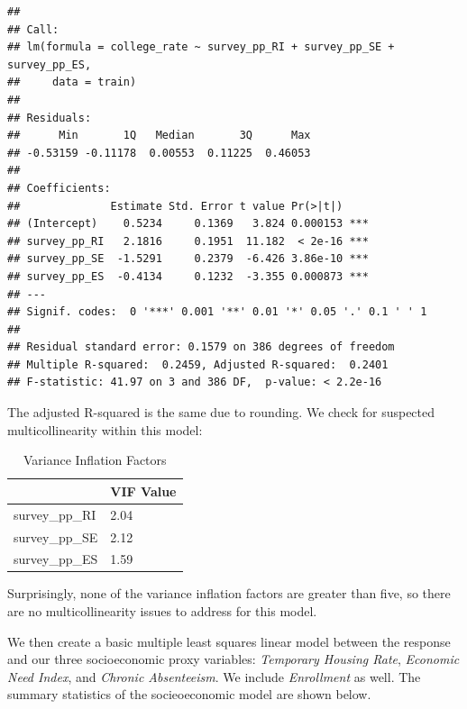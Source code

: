 \documentclass[
  man,floatsintext]{apa6}
\begin{document}
\begin{verbatim}
## 
## Call:
## lm(formula = college_rate ~ survey_pp_RI + survey_pp_SE + survey_pp_ES, 
##     data = train)
## 
## Residuals:
##      Min       1Q   Median       3Q      Max 
## -0.53159 -0.11178  0.00553  0.11225  0.46053 
## 
## Coefficients:
##              Estimate Std. Error t value Pr(>|t|)    
## (Intercept)    0.5234     0.1369   3.824 0.000153 ***
## survey_pp_RI   2.1816     0.1951  11.182  < 2e-16 ***
## survey_pp_SE  -1.5291     0.2379  -6.426 3.86e-10 ***
## survey_pp_ES  -0.4134     0.1232  -3.355 0.000873 ***
## ---
## Signif. codes:  0 '***' 0.001 '**' 0.01 '*' 0.05 '.' 0.1 ' ' 1
## 
## Residual standard error: 0.1579 on 386 degrees of freedom
## Multiple R-squared:  0.2459, Adjusted R-squared:  0.2401 
## F-statistic: 41.97 on 3 and 386 DF,  p-value: < 2.2e-16
\end{verbatim}

The adjusted R-squared is the same due to rounding. We check for suspected multicollinearity within this model:

\begin{table}[H]

\begin{center}
\begin{threeparttable}

\caption{\label{tab:base-rating-model-vif-check}Variance Inflation Factors}

\begin{tabular}{ll}
\toprule
 & \multicolumn{1}{c}{VIF Value}\\
\midrule
survey\_pp\_RI & 2.04\\
survey\_pp\_SE & 2.12\\
survey\_pp\_ES & 1.59\\
\bottomrule
\end{tabular}

\end{threeparttable}
\end{center}

\end{table}

Surprisingly, none of the variance inflation factors are greater than five, so there are no multicollinearity issues to address for this model.

We then create a basic multiple least squares linear model between the response and our three socioeconomic proxy variables: \emph{Temporary Housing Rate}, \emph{Economic Need Index}, and \emph{Chronic Absenteeism}. We include \emph{Enrollment} as well. The summary statistics of the socieoeconomic model are shown below.
\end{document}
